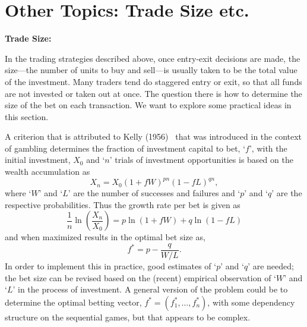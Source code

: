 \section{Other Topics: Trade Size etc.}

\noindent \textbf{Trade Size:} \twomedskip

In the trading strategies described above, once entry-exit decisions are made, the size---the number of units to buy and sell---is usually taken to be the total value of the investment. Many traders tend do staggered entry or exit, so that all funds are not invested or taken out at once. The question there is how to determine the size of the bet on each transaction. We want to explore some practical ideas in this section. 


A criterion that is attributed to Kelly (1956)~\cite{kelly56} that was introduced in the context of gambling determines the fraction of investment capital to bet, `$f$', with the initial investment, $X_0$ and `$n$' trials of investment opportunities is based on the wealth accumulation as
	\begin{equation} \label{eqn:xmx01f}
	X_n= X_0(1+fW)^{pn} (1-fL)^{qn},
	\end{equation}
where `$W$' and `$L$' are the number of successes and failures and `$p$' and `$q$' are the respective probabilities. Thus the growth rate per bet is given as
	\begin{equation} \label{eqn:1nln}
	\dfrac{1}{n} \ln \left(\dfrac{X_n}{X_0}\right)= p \ln(1+fW) + q \ln(1-fL)
	\end{equation}
and when maximized results in the optimal bet size as,
	\begin{equation} \label{eqn:fstarp}
	f^*= p - \dfrac{q}{W/L}.
	\end{equation}
In order to implement this in practice, good estimates of `$p$' and `$q$' are needed; the bet size can be revised based on the (recent) empirical observation of `$W$' and `$L$' in the process of investment. A general version of the problem could be to determine the optimal betting vector, $f^*=(f_1^*, \ldots, f_n^*)$, with some dependency structure on the sequential games, but that appears to be complex. 


